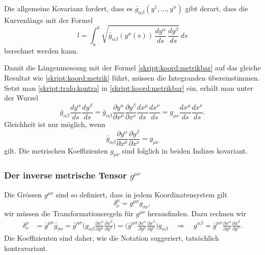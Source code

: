 Die allgemeine Kovarianz fordert, dass es $\bar g_{\alpha\beta}(y^1,\dots,y^n)$
gibt derart, dass die Kurvenlänge mit der Formel
\begin{equation}
l = \int_a^b
\sqrt{\bar g_{\alpha\beta}(y^\sigma(s))\,\frac{dy^\alpha}{ds}\,\frac{dy^\beta}{ds}}
\,ds
\label{skript:koord:metrikbar}
\end{equation}
berechnet werden kann.

Damit die Längenmessung mit der Formel
\eqref{skript:koord:metrikbar} auf das gleiche Resultat wie 
\eqref{skript:koord:metrik} führt, müssen die Integranden übereinstimmen.
Setzt man \eqref{skript:trafo:kontra} in \eqref{skript:koord:metrikbar}
ein, erhält man unter der Wurzel
\begin{equation*}
\bar g_{\alpha\beta}
\frac{dy^\alpha}{ds}\frac{dy^\beta}{ds}
=
\bar g_{\alpha\beta}
\frac{\partial y^\alpha}{\partial x^\mu}
\frac{\partial y^\beta}{\partial x^\nu}
\frac{dx^\mu}{ds}\frac{dx^\nu}{ds}
=
g_{\mu\nu}
\frac{dx^\mu}{ds}\frac{dx^\nu}{ds}.
\end{equation*}
Gleichheit ist nur möglich, wenn
\begin{equation}
\bar g_{\alpha\beta}
\frac{\partial y^\alpha}{\partial x^\mu}
\frac{\partial y^\beta}{\partial x^\nu}
=
g_{\mu\nu}
\end{equation}
gilt.
Die metrischen Koeffizienten $g_{\mu\nu}$ sind folglich in beiden
Indizes kovariant.

\subsubsection{Der inverse metrische Tensor $g^{\mu\nu}$}
Die Grössen $g^{\mu\nu}$ sind so definiert, dass in jedem Koordinatensystem
gilt
\[
\delta^\mu_\nu = g^{\mu\sigma}g_{\sigma\nu},
\]
wir müssen die Transformationsregeln für $g^{\mu\nu}$ herausfinden.
Dazu rechnen wir
\begin{align*}
\delta^\mu_\nu
&=
\bar g^{\mu\sigma}\bar g_{\sigma\nu}
=
\bar g^{\mu\sigma}
\biggl(
g_{\alpha\beta}
\frac{\partial x^\alpha}{\partial y^\mu}
\frac{\partial x^\beta}{\partial y^\sigma}
\biggr)
=
\biggl(
\bar g^{\mu\sigma}
\frac{\partial x^\alpha}{\partial y^\mu}
\frac{\partial x^\beta}{\partial y^\sigma}
\biggr)
g_{\alpha\beta}
\quad
\Rightarrow
\quad
g^{\alpha\beta}
=
\bar g^{\mu\sigma}
\frac{\partial x^\alpha}{\partial y^\mu}
\frac{\partial x^\beta}{\partial y^\sigma}.
\end{align*}
Die Koeffizienten sind daher, wie die Notation suggeriert, tatsächlich
kontravariant.

